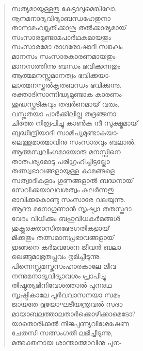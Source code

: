 \begin{verse}
സത്യമായുള്ളതു കേട്ടാലുമെങ്കിലോ.\\
നൂനമനാദ്യവിദ്യാബന്ധഹേതുനാ\\
താനാമഹങ്കൃതിക്കാശു തല്‍ക്കാര്യമായ്\\
സംസാരമുണ്ടാമപാര്‍ഥകമായതും\\
സംസാരമോ രാഗരോഷാദി സങ്കുലം\\
മാനസം സംസാരകാരണമായതും\\
മാനസത്തിന്നു ബന്ധം ഭവിക്കുന്നതും\\
ആത്മമനസ്സമാനത്വം ഭവിക്കയാ-\\
ലാത്മനസ്തല്‍കൃതബന്ധം ഭവിക്കുന്നു.\\
രക്താദിസാന്നിദ്ധ്യമുണ്ടാക കാരണം\\
ശുദ്ധസ്ഫടികവും തദ്വര്‍ണമായ് വരും.\\
വസ്തുതയാ പാര്‍ക്കിലില്ല തദ്രഞ്ജനാ\\
ചിത്തേ നിരൂപിച്ചു കാണ്‍ക നീ സൂക്ഷ്മമായ്\\
ബുദ്ധീന്ദ്രിയാദി സാമീപ്യമുണ്ടാകയാ-\\
ലെത്തുമാത്മാവിനു സംസാരവും ബലാല്‍.\\
ആത്മസ്വലിംഗമായോരു മനസ്സിനെ\\
താത്പര്യമോടു പരിഗ്രഹിച്ചിട്ടല്ലോ\\
തത്സ്വഭാവങ്ങളായുള്ള കാമങ്ങളെ\\
സത്വാദികളാം ഗുണങ്ങളാല്‍ ബദ്ധനായ്\\
സേവിക്കയാലവശത്വം കലര്‍ന്നതു\\
ഭാവിക്കകൊണ്ടു സംസാരേ വലയുന്നു.\\
ആദൗ മനോഗുണാന്‍ സൃഷ്ട്വാ തതസ്തദാ\\
വേദം വിധിക്കും ബഹുവിധകര്‍മങ്ങള്‍\\
ശുക്ലരക്താസിതഭേദഗതികളായ്\\
മിക്കതും തത്സമാനപ്രഭാവങ്ങളായ്\\
ഇങ്ങനെ കര്‍മവശേന ജീവന്‍ ബലാ-\\
ലെങ്ങുമാഭൂതപ്ലവം ഭ്രമിച്ചീടുന്നു.\\
പിന്നെസ്സമസ്തസംഹാരകാലേ ജീവ-\\
നന്നുമനാദ്യവിദ്യാവശം പ്രാപിച്ചു\\
തിഷ്ഠത്യഭിനിവേശത്താല്‍ പുനരഥ\\
സൃഷ്ടികാലേ പൂര്‍വവാസനയാ സമം\\
ജായതേ ഭൂയോഘടീയന്ത്രവല്‍ സദാ\\
മായാബലത്താലതാര്‍ക്കൊഴിക്കാമെടോ?\\
യാതൊരിക്കല്‍ നിജപുണ്യവിശേഷേണ\\
ചേതസി സത്സംഗതി ലഭിച്ചീടുന്നു,\\
മത്ഭക്തനായ ശാന്താത്മാവിനു പുന-\\

\end{verse}
